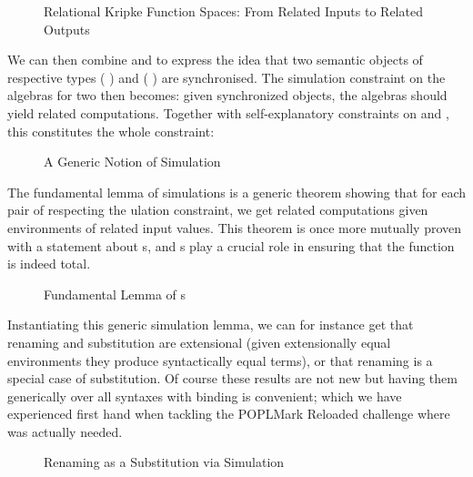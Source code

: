 \begin{figure}[h]
\caption{Relational Kripke Function Spaces: From Related Inputs to Related Outputs}
\end{figure}

We can then combine  and  to express the idea
that two semantic objects of respective types
   (  ) and
   (  ) are
synchronised. The simulation constraint on the algebras for two \semrec{}
then becomes: given synchronized objects, the algebras should yield
related computations. Together with self-explanatory constraints on
 and , this constitutes the whole 
constraint:

\begin{figure}[h]
\caption{A Generic Notion of Simulation}
\end{figure}

The fundamental lemma of simulations is a generic theorem showing that for
each pair of \semrec{} respecting the ulation constraint, we
get related computations given environments of related input values. This
theorem is once more mutually proven with a statement about s,
and s play a crucial role in ensuring that the function is indeed total.

\begin{figure}[h]
\caption{Fundamental Lemma of s}
\end{figure}

Instantiating this generic simulation lemma, we can for instance get
that renaming and substitution are extensional (given extensionally
equal environments they produce syntactically equal terms), or that
renaming is a special case of substitution. Of course these results
are not new but having them generically over all syntaxes with binding
is convenient; which we have experienced first hand when tackling the
POPLMark Reloaded challenge where  was actually needed.

\begin{figure}[h]
\caption{Renaming as a Substitution via Simulation}
\end{figure}

